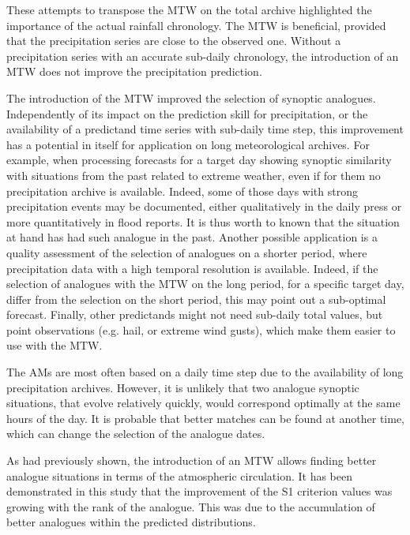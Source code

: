 \documentclass[hess, manuscript]{copernicus}
\begin{document}
	These attempts to transpose the MTW on the total archive highlighted the importance of the actual rainfall chronology. The MTW is beneficial, provided that the precipitation series are close to the observed one. Without a precipitation series with an accurate sub-daily chronology, the introduction of an MTW does not improve the precipitation prediction.
	
	The introduction of the MTW improved the selection of synoptic analogues. Independently of its impact on the prediction skill for precipitation, or the availability of a predictand time series with sub-daily time step, this improvement has a potential in itself for application on long meteorological archives. For example, when processing forecasts for a target day showing synoptic similarity with situations from the past related to extreme weather, even if for them no precipitation archive is available. Indeed, some of those days with strong precipitation events may be documented, either qualitatively in the daily press or more quantitatively in flood reports. It is thus worth to known that the situation at hand has had such analogue in the past. Another possible application is a quality assessment of the selection of analogues on a shorter period, where precipitation data with a high temporal resolution is available. Indeed, if the selection of analogues with the MTW on the long period, for a specific target day, differ from the selection on the short period, this may point out a sub-optimal forecast. Finally, other predictands might not need sub-daily total values, but point observations (e.g. hail, or extreme wind gusts), which make them easier to use with the MTW.
	
	
	\conclusions  %
	\label{sec:conclusions}
	
	The AMs are most often based on a daily time step due to the availability of long precipitation archives. However, it is unlikely that two analogue synoptic situations, that evolve relatively quickly, would correspond optimally at the same hours of the day. It is probable that better matches can be found at another time, which can change the selection of the analogue dates.
	
	As \citet{Finet2008} had previously shown, the introduction of an MTW allows finding better analogue situations in terms of the atmospheric circulation. It has been demonstrated in this study that the improvement of the S1 criterion values was growing with the rank of the analogue. This was due to the accumulation of better analogues within the predicted distributions.
	
\end{document}

